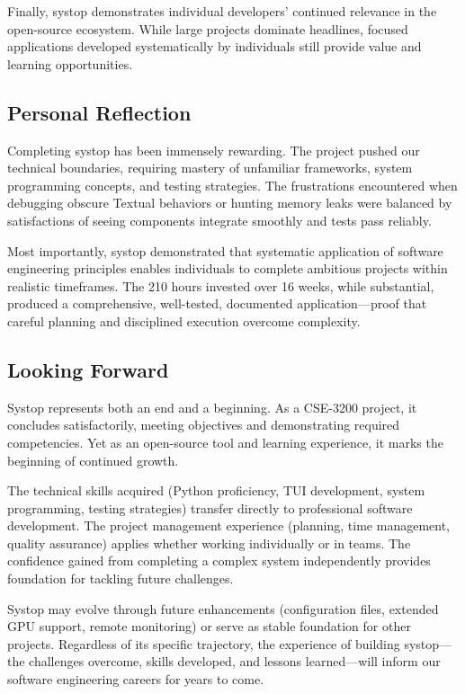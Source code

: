 \documentclass[12pt,a4paper,oneside]{report}
\begin{document}
Finally, systop demonstrates individual developers' continued relevance in the open-source ecosystem. While large projects dominate headlines, focused applications developed systematically by individuals still provide value and learning opportunities.

\subsection{Personal Reflection}

Completing systop has been immensely rewarding. The project pushed our technical boundaries, requiring mastery of unfamiliar frameworks, system programming concepts, and testing strategies. The frustrations encountered when debugging obscure Textual behaviors or hunting memory leaks were balanced by satisfactions of seeing components integrate smoothly and tests pass reliably.

Most importantly, systop demonstrated that systematic application of software engineering principles enables individuals to complete ambitious projects within realistic timeframes. The 210 hours invested over 16 weeks, while substantial, produced a comprehensive, well-tested, documented application---proof that careful planning and disciplined execution overcome complexity.

\subsection{Looking Forward}

Systop represents both an end and a beginning. As a CSE-3200 project, it concludes satisfactorily, meeting objectives and demonstrating required competencies. Yet as an open-source tool and learning experience, it marks the beginning of continued growth.

The technical skills acquired (Python proficiency, TUI development, system programming, testing strategies) transfer directly to professional software development. The project management experience (planning, time management, quality assurance) applies whether working individually or in teams. The confidence gained from completing a complex system independently provides foundation for tackling future challenges.

Systop may evolve through future enhancements (configuration files, extended GPU support, remote monitoring) or serve as stable foundation for other projects. Regardless of its specific trajectory, the experience of building systop---the challenges overcome, skills developed, and lessons learned---will inform our software engineering careers for years to come.
\end{document}
